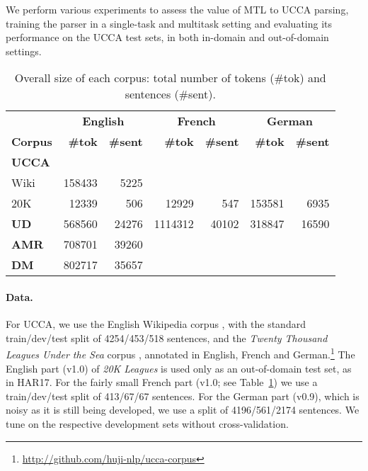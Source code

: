 \documentclass[11pt,a4paper]{article}
\begin{document}
We perform various experiments to assess the value of MTL to UCCA parsing,
training the parser in a single-task and multitask setting
and evaluating its performance on the UCCA test sets, in both in-domain and out-of-domain settings.

\begin{table}[t]
\centering
\small
\setlength\tabcolsep{3pt}
\begin{tabular}{l|rr|rr|rr}
& \multicolumn{2}{c|}{\footnotesize \bf English} & \multicolumn{2}{c|}{\footnotesize \bf French} & \multicolumn{2}{c}{\footnotesize \bf German} \\
\footnotesize \bf Corpus & \footnotesize \bf {\#}tok & \footnotesize \bf {\#}sent & \footnotesize \bf {\#}tok & \footnotesize \bf {\#}sent & \footnotesize \bf {\#}tok & \footnotesize \bf {\#}sent \\
\hline
\textbf{UCCA} &&&& \\
Wiki & 158433 & 5225 &&&& \\
20K & 12339 & 506 & 12929 & 547 & 153581 & 6935 \\
\hline
\textbf{UD} & 568560 & 24276 & 1114312 & 40102 & 318847 & 16590 \\
\hline
\textbf{AMR} & 708701 & 39260 \\
\hline
\textbf{DM} & 802717 & 35657 \\
\end{tabular}
\caption{Overall size of each corpus: total number of tokens ({\#}tok) and sentences ({\#}sent).
\label{tab:corpora}}
\end{table}

\paragraph{Data.}

For UCCA, we use the English Wikipedia corpus \cite[v1.0; ][]{abend2013universal},
with the standard train/dev/test split of 4254/453/518 sentences,
and the \textit{Twenty Thousand Leagues Under the Sea} corpus
\cite[\textit{20K Leagues};][]{sulem2015conceptual},
annotated in English, French and German.\footnote{\mbox{\url{http://github.com/huji-nlp/ucca-corpus}}}
The English part (v1.0) of \textit{20K Leagues} is used only as an out-of-domain test set, as in HAR17.
For the fairly small French part (v1.0; see Table~\ref{tab:corpora})
we use a train/dev/test split of 413/67/67 sentences.
For the German part (v0.9), which is noisy as it is still being developed,
we use a split of 4196/561/2174 sentences.
We tune on the respective development sets without cross-validation.
\end{document}

